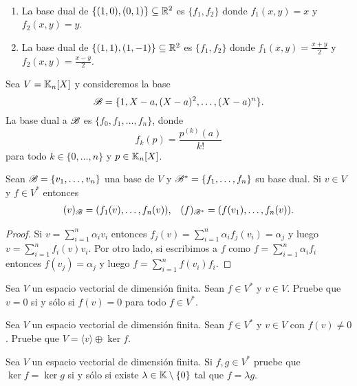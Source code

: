 \begin{examples}\
	\label{exa:base_dual}
	\begin{enumerate}
		\item La base dual de $\{(1,0),(0,1)\}\subseteq\mathbb{R}^2$ es $\{f_1,f_2\}$
			donde $f_1(x,y)=x$ y $f_2(x,y)=y$.
		\item La base dual de $\{(1,1),(1,-1)\}\subseteq\mathbb{R}^2$ es $\{f_1,f_2\}$
			donde $f_1(x,y)=\frac{x+y}{2}$ y $f_2(x,y)=\frac{x-y}{2}$.
	\end{enumerate}
\end{examples}

\begin{example}
	Sea $V=\mathbb{K}_n[X]$ y consideremos la base 
	\[
		\mathscr{B}=\{1,X-a,(X-a)^2,\dots,(X-a)^n\}.
	\]
	La base dual a $\mathscr{B}$ es $\{f_0,f_1,\dots,f_n\}$, donde
	\[
		f_k(p)=\frac{p^{(k)}(a)}{k!}
	\]
	para todo $k\in\{0,\dots,n\}$ y $p\in\mathbb{K}_n[X]$. 
\end{example}

\begin{prop}
	Sean $\mathscr{B}=\{v_1,\dots,v_n\}$ una base de $V$ y $\mathscr{B}^*=\{f_1,\dots,f_n\}$ su
	base dual. Si $v\in V$ y $f\in V^*$ entonces 
	\begin{align}
		(v)_{\mathscr{B}}=(f_1(v),\dots,f_n(v)), && 
		(f)_{\mathscr{B}^*}=(f(v_1),\dots,f_n(v)).
	\end{align}

	\begin{proof}
		Si $v=\sum_{i=1}^n\alpha_iv_i$ entonces
		$f_j(v)=\sum_{i=1}^n\alpha_if_j(v_i)=\alpha_j$ y luego $v=\sum_{i=1}^n
		f_i(v)v_i$. Por otro lado, si escribimos a $f$ como
		$f=\sum_{i=1}^n\alpha_if_i$ entonces $f(v_j)=\alpha_j$ y luego
		$f=\sum_{i=1}^n f(v_i)f_i$. 
	\end{proof}
\end{prop}

\begin{xca}
    \label{xca:v=0<=>f(v)=0}
    Sea $V$ un espacio vectorial de dimensión finita. Sean $f\in V^*$ y $v\in
    V$.  Pruebe que $v=0$ si y sólo si $f(v)=0$ para todo $f\in V^*$. 
\end{xca}

\begin{xca}
    \label{xca:V=<v>+kerf}
    Sea $V$ un espacio vectorial de dimensión finita.  Sean $f\in V^*$ y $v\in
    V$ con $f(v)\ne0$. Pruebe que $V=\langle v\rangle\oplus \ker f$.
\end{xca}

\begin{xca}
    \label{xca:kerf=kerg}
    Sea $V$ un espacio vectorial de dimensión finita. Si $f,g\in V^*$ pruebe
    que $\ker f=\ker g$ si y sólo si existe $\lambda\in\mathbb{K}\setminus\{0\}$ tal
    que $f=\lambda g$.
\end{xca}

